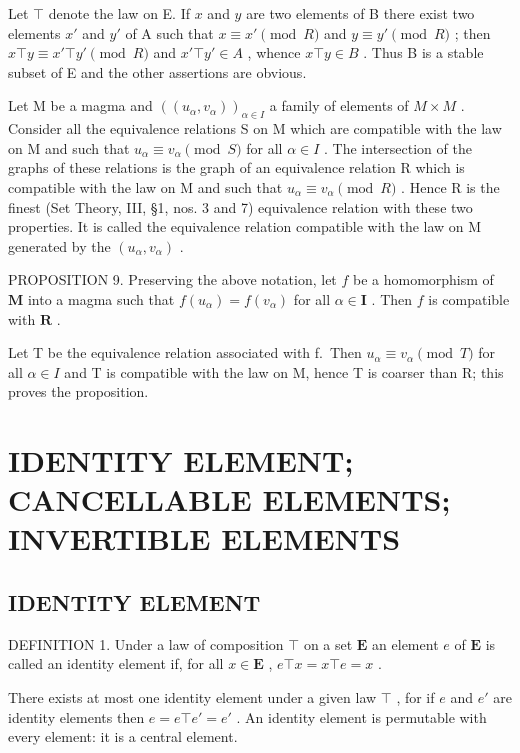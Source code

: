 Let \(\top\) denote the law on E. If \(x\) and \(y\) are two elements of B there exist two elements \(x'\) and \(y'\) of A such that \(x \equiv x' \pmod{R}\) and \(y \equiv y' \pmod{R}\) ; then \(x \top y \equiv x' \top y' \pmod{R}\) and \(x' \top y' \in A\) , whence \(x \top y \in B\) . Thus B is a stable subset of E and the other assertions are obvious.

Let M be a magma and \(((u_{\alpha}, v_{\alpha}))_{\alpha \in I}\) a family of elements of \(M \times M\) . Consider all the equivalence relations S on M which are compatible with the law on M and such that \(u_{\alpha} \equiv v_{\alpha} \pmod{S}\) for all \(\alpha \in I\) . The intersection of the graphs of these relations is the graph of an equivalence relation R which is compatible with the law on M and such that \(u_{\alpha} \equiv v_{\alpha} \pmod{R}\) . Hence R is the finest (Set Theory, III, §1, nos. 3 and 7) equivalence relation with these two properties. It is called the equivalence relation compatible with the law on M generated by the \((u_{\alpha}, v_{\alpha})\) .

PROPOSITION 9. Preserving the above notation, let \(f\) be a homomorphism of \(\mathbf{M}\) into a magma such that \(f(u_{\alpha}) = f(v_{\alpha})\) for all \(\alpha \in \mathbf{I}\) . Then \(f\) is compatible with \(\mathbf{R}\) .

Let T be the equivalence relation associated with f.~Then \(u_{\alpha} \equiv v_{\alpha} \pmod{T}\) for all \(\alpha \in I\) and T is compatible with the law on M, hence T is coarser than R; this proves the proposition.

\section{IDENTITY ELEMENT; CANCELLABLE ELEMENTS; INVERTIBLE ELEMENTS}

\subsection{IDENTITY ELEMENT}

DEFINITION 1. Under a law of composition \(\top\) on a set \(\mathbf{E}\) an element \(e\) of \(\mathbf{E}\) is called an identity element if, for all \(x \in \mathbf{E}\) , \(e \top x = x \top e = x\) .

There exists at most one identity element under a given law \(\top\) , for if \(e\) and \(e'\) are identity elements then \(e = e \top e' = e'\) . An identity element is permutable with every element: it is a central element.

